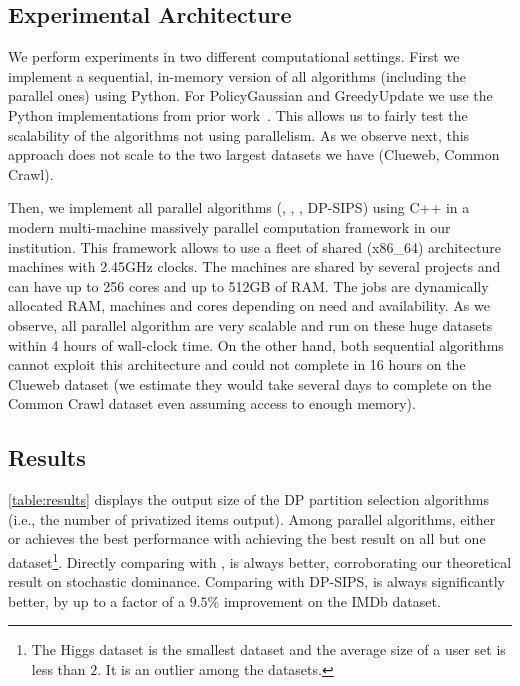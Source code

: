 \subsection{Experimental Architecture}
We perform experiments in two different computational settings. First we implement a sequential, in-memory version of all algorithms (including the parallel ones) using Python.
For PolicyGaussian and GreedyUpdate we use the Python implementations from prior work~\cite{gopi2020dpunion, carvalho2022incorporatingitem}.
This allows us to fairly test the scalability of the algorithms not using parallelism. As we observe next, this approach does not scale to the two largest datasets we have (Clueweb, Common Crawl). 

Then, we implement all parallel algorithms (\ouralgo{}, \ouralgotworounds{}, \basicalgo{}, DP-SIPS) using C++ in a modern multi-machine massively parallel computation framework in our institution. This framework allows to use a fleet of shared (x86\_64) architecture machines with 2.45GHz clocks. The machines are shared by several projects and can have up to 256 cores and up to 512GB of RAM. The jobs are dynamically allocated RAM, machines and cores depending on need and availability. 
As we observe, all parallel algorithm are very scalable and run on these huge datasets within 4 hours of wall-clock time. On the other hand, both sequential algorithms cannot exploit this architecture and could not complete in 16 hours on the Clueweb dataset (we estimate they would take several days to complete on the Common Crawl dataset even assuming access to enough memory).

\subsection{Results}
\cref{table:results} displays the output size of the DP partition selection algorithms (i.e., the number of privatized items output).
Among parallel algorithms, either \ouralgo{} or \ouralgotworounds{} achieves the best performance with \ouralgotworounds{} achieving the best result on all but one dataset\footnote{The Higgs dataset is the smallest dataset and the average size of a user set is less than $2$. It is an outlier among the datasets.}.
Directly comparing \ouralgo{} with \basicalgo{}, \ouralgo{} is always better, corroborating our theoretical result on stochastic dominance.
Comparing \ouralgotworounds{} with DP-SIPS, \ouralgotworounds{} is always significantly better, by up to a factor of a $9.5\%$ improvement on the IMDb dataset.

